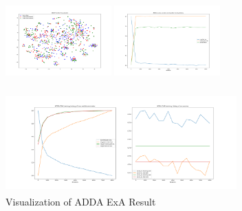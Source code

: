 \documentclass[conference]{IEEEtran}
\begin{document}
\begin{figure}[htb]

\centering
\begin{minipage}[t]{0.26\textwidth}
\includegraphics[width=1.6in, height=1.5in]{Ladda/std_A2R/ADDA_visual.png}
\end{minipage}%
\begin{minipage}[t]{0.26\textwidth}
\includegraphics[width=1.6in, height=1.5in]{Ladda/std_A2R/clf.png}
\end{minipage}%
\begin{minipage}[t]{0.45\textwidth}
\includegraphics[width=3.5in, height=1.5in]{Ladda/std_A2R/gan.png}
\end{minipage}%
\caption{Visualization of ADDA ExA Result}\label{fig:ExA}
\end{figure}
\end{document}
